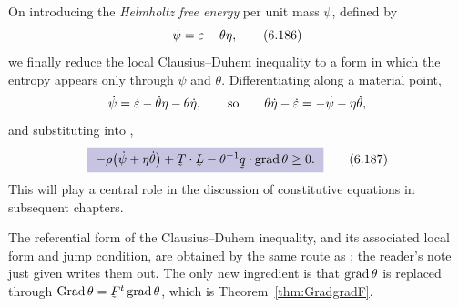 On introducing the \emph{Helmholtz free energy} per unit mass $\psi$,
defined by
\begin{equation}
   \psi=\varepsilon-\theta\eta ,
   \tag{6.186}\label{eq:6.186}
\end{equation}
we finally reduce the local Clausius--Duhem inequality to a form in
which the entropy appears only through $\psi$ and $\theta$.
Differentiating  along a material point,
\[
   \dot\psi=\dot{\varepsilon}-\dot\theta\eta-\theta\dot\eta ,
   \qquad\text{so}\qquad
   \theta\dot\eta-\dot{\varepsilon}=-\dot\psi-\eta\dot\theta ,
\]
and substituting into ,
\begin{equation}
   \boxed{\ -\rho\big(\dot\psi+\eta\dot\theta\big)+\bT\cdot\bL
   -\theta^{-1}\ip\bq{\grad\theta}\geq0 .\ }
   \tag{6.187}\label{eq:6.187}
\end{equation}
This will play a central role in the discussion of constitutive
equations in subsequent chapters.


The referential form of the Clausius--Duhem inequality, and its
associated local form and jump condition, are obtained by the same
route as ; the reader's note just given writes them out.
The only new ingredient is that $\operatorname{grad}\theta$ is replaced through
$\Grad\theta=\bF^{t}\grad\theta$, which is
Theorem~\ref{thm:GradgradF}.

